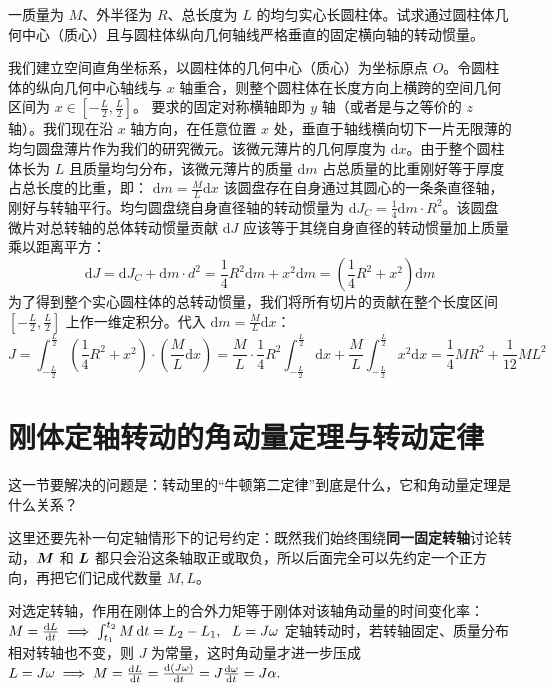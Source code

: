 \documentclass[lang=cn,11pt]{elegantbook}
\begin{document}
\begin{example}
 一质量为 $M$、外半径为 $R$、总长度为 $L$ 的均匀实心长圆柱体。试求通过圆柱体几何中心（质心）且与圆柱体纵向几何轴线严格垂直的固定横向轴的转动惯量。
\end{example}
\begin{solution}
 我们建立空间直角坐标系，以圆柱体的几何中心（质心）为坐标原点 $O$。令圆柱体的纵向几何中心轴线与 $x$ 轴重合，则整个圆柱体在长度方向上横跨的空间几何区间为 $x \in \left[-\frac{L}{2}, \frac{L}{2}\right]$。
 要求的固定对称横轴即为 $y$ 轴（或者是与之等价的 $z$ 轴）。我们现在沿 $x$ 轴方向，在任意位置 $x$ 处，垂直于轴线横向切下一片无限薄的均匀圆盘薄片作为我们的研究微元。该微元薄片的几何厚度为 $\mathrm{d}x$。由于整个圆柱体长为 $L$ 且质量均匀分布，该微元薄片的质量 $\mathrm{d}m$ 占总质量的比重刚好等于厚度占总长度的比重，即： \(\mathrm{d}m = \frac{M}{L}\mathrm{d}x\) 该圆盘存在自身通过其圆心的一条条直径轴，刚好与转轴平行。均匀圆盘绕自身直径轴的转动惯量为 $\mathrm{d}J_C = \frac{1}{4}\mathrm{d}m \cdot R^2$。该圆盘微片对总转轴的总体转动惯量贡献 $\mathrm{d}J$ 应该等于其绕自身直径的转动惯量加上质量乘以距离平方：$$\mathrm{d}J = \mathrm{d}J_C + \mathrm{d}m \cdot d^2 = \frac{1}{4}R^2\mathrm{d}m + x^2\mathrm{d}m = \left( \frac{1}{4}R^2 + x^2 \right)\mathrm{d}m$$为了得到整个实心圆柱体的总转动惯量，我们将所有切片的贡献在整个长度区间 $\left[-\frac{L}{2}, \frac{L}{2}\right]$ 上作一维定积分。代入 $\mathrm{d}m = \frac{M}{L}\mathrm{d}x$：
 $$J = \int_{-\frac{L}{2}}^{\frac{L}{2}} \left( \frac{1}{4}R^2 + x^2 \right) \cdot \left( \frac{M}{L}\mathrm{d}x \right)= \frac{M}{L} \cdot \frac{1}{4}R^2 \int_{-\frac{L}{2}}^{\frac{L}{2}} \mathrm{d}x + \frac{M}{L} \int_{-\frac{L}{2}}^{\frac{L}{2}} x^2 \mathrm{d}x = \frac{1}{4}MR^2 + \frac{1}{12}ML^2$$
\end{solution}

\section{刚体定轴转动的角动量定理与转动定律}

这一节要解决的问题是：转动里的“牛顿第二定律”到底是什么，它和角动量定理是什么关系？

这里还要先补一句定轴情形下的记号约定：既然我们始终围绕\textbf{同一固定转轴}讨论转动，\(\vb*{M}\) 和 \(\vb*{L}\) 都只会沿这条轴取正或取负，所以后面完全可以先约定一个正方向，再把它们记成代数量 \(M,L\)。

\begin{theorem}[刚体定轴转动的角动量定理]\label{thm:rigid-body-angular-momentum-theorem}
对选定转轴，作用在刚体上的合外力矩等于刚体对该轴角动量的时间变化率：
 \(M=\dv{L}{t} \implies \int_{t_1}^{t_2} M\,\dd t=L_2-L_1,~~L=J\omega\) 定轴转动时，若转轴固定、质量分布相对转轴也不变，则 \(J\) 为常量，这时角动量才进一步压成
 \(L=J\omega \implies M=\dv{L}{t} =\dv{(J\omega)}{t} =J\dv{\omega}{t} =J\alpha.\) 
\end{theorem}
\end{document}
